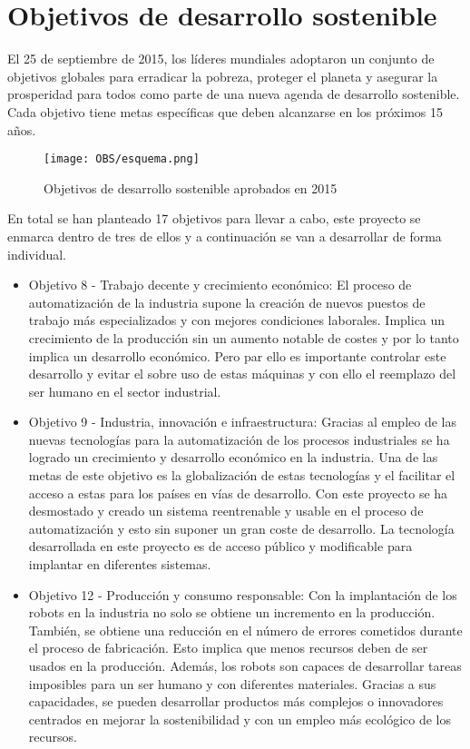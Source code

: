 \chapter{Objetivos de desarrollo sostenible}
\label{chap:OBS}
El 25 de septiembre de 2015, los líderes mundiales adoptaron un conjunto de objetivos globales para erradicar la pobreza, proteger el planeta y asegurar la prosperidad para todos como parte de una nueva agenda de desarrollo sostenible. Cada objetivo tiene metas específicas que deben alcanzarse en los próximos 15 años.

\begin{figure}[ht]  %
	\centering
	\texttt{[image: OBS/esquema.png]}
	\vspace{-5pt}
	\caption{Objetivos de desarrollo sostenible aprobados en 2015}
	\label{fig:obs}
\end{figure}

En total se han planteado 17 objetivos para llevar a cabo, este proyecto se enmarca dentro de tres de ellos y a continuación se van a desarrollar de forma individual.

\begin{itemize}
\item Objetivo 8 - Trabajo decente y crecimiento económico: El proceso de automatización de la industria supone la creación de nuevos puestos de trabajo más especializados y con mejores condiciones laborales. Implica un crecimiento de la producción sin un aumento notable de costes y por lo tanto implica un desarrollo económico. Pero par ello es importante controlar este desarrollo y evitar el sobre uso de estas máquinas y con ello el reemplazo del ser humano en el sector industrial.
\item Objetivo 9 - Industria, innovación e infraestructura: Gracias al empleo de las nuevas tecnologías para la automatización de los procesos industriales se ha logrado un crecimiento y desarrollo económico en la industria. Una de las metas de este objetivo es la globalización de estas tecnologías y el facilitar el acceso a estas para los países en vías de desarrollo. Con este proyecto se ha desmostado y creado un sistema reentrenable y usable en el proceso de automatización y esto sin suponer un gran coste de desarrollo. La tecnología desarrollada en este proyecto es de acceso público y modificable para implantar en diferentes sistemas.
\item Objetivo 12 - Producción y consumo responsable: Con la implantación de los robots en la industria no solo se obtiene un incremento en la producción. También, se obtiene una reducción en el número de errores cometidos durante el proceso de fabricación. Esto implica que menos recursos deben de ser usados en la producción. Además, los robots son capaces de desarrollar tareas imposibles para un ser humano y con diferentes materiales. Gracias a sus capacidades, se pueden desarrollar productos más complejos o innovadores centrados en mejorar la sostenibilidad y con un empleo más ecológico de los recursos.
\end{itemize}

